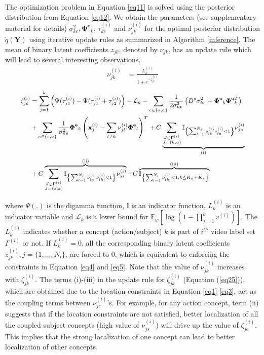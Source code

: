 \documentclass[runningheads]{llncs}
\begin{document}
The optimization problem in Equation \eqref{eq11} is solved using the posterior distribution from Equation \eqref{eq12}. We obtain the parameters (see supplementary material for details) $\sigma_{ke}^2, \mathbf{\Phi^e}_k$, $\tau_{ke}^{(i)}$ and $\nu_{jk}^{(i)}$ for the optimal posterior distribution $\tilde{q}(\mathbf{Y})$ using iterative update rules as summarized in Algorithm \ref{inference}. 
The mean of binary latent coefficients $z_{jk}$, denoted by $\nu_{jk}$, has an update rule which will lead to several interesting observations.
\begin{align}
\nu_{jk}^{(i)} &= \frac{L_k^{(i)}}{1+e^{-\zeta_{jk}^{(i)}}}  \label{eq24}
\end{align}
\vspace{-4mm}
\begin{equation}
\small{
\begin{aligned}
 \label{eq25}
\zeta_{jk}^{(i)} &= \sum_{j=1}^k \left(\Psi(\tau_{j1}^{(i)}) - \Psi(\tau_{j1}^{(i)} + \tau_{j2}^{(i)})\right) - \mathcal{L}_k - \sum_{e\in\{s,a\}}\frac{1}{2\sigma_{ne}^2}\left(D^e\sigma_{ke}^2 + \mathbf{\Phi^e}_k\mathbf{\Phi^e}_k^T\right)  \\ 
&+ \sum_{e\in\{s,a\}} \frac{1}{\sigma_{ne}^2}  \mathbf{\Phi^e}_k\left(\mathbf{x}_j^{(i)} - \sum_{l\neq k} \nu_{jl}^{(i)}\mathbf{\Phi^e}_l\right)^T 
+ C\underbrace{\sum_{\substack{J\in \Gamma^{(i)} \\ J=(k,a)}} \mathbb{I}_{\left\lbrace\sum_{l=1}^{N_i}\nu_{lk}^{(i)}\nu_{la}^{(i)} < 1\right\rbrace} \nu_{ja}^{(i)}}_\text{(i)} \\
 &+ C\overbrace{\sum_{\substack{J\in \Gamma^{(i)} \\ J=(s,k)}} \mathbb{I}_{\left\lbrace\sum_{l=1}^{N_i}\nu_{ls}^{(i)}\nu_{lk}^{(i)} < 1\right\rbrace} \nu_{js}^{(i)}}^\text{(ii)} + C\overbrace{\mathbb{I}_{\left\lbrace\sum_{l=1}^{N_i}\nu_{lk}^{(i)} < 1, k \leq K_a + K_s\right\rbrace}}^\text{(iii)}
 \end{aligned}
 }
\end{equation}

\noindent
where $\Psi(.)$ is the digamma function, $\mathbb{I}$ is an indicator function, $L_k^{(i)}$  is an indicator variable and $\mathcal{L}_k $ is a lower bound for $\mathbb{E}_{\tilde{w}}[\log(1 - \prod_{j=1}^k v^{(i)})]$. The $L_k^{(i)}$ indicates whether a concept (action/subject) $k$ is part of $i^{th}$ video label set $\Gamma^{(i)}$ or not. If $L_k^{(i)} = 0$, all the corresponding binary latent coefficients $z_{jk}^{(i)}, j = \{1,\dots,N_i\}$, are forced to 0, which is equivalent to enforcing the constraints in Equation \eqref{eq4} and \eqref{eq5}. Note that the value of $\nu_{jk}^{(i)}$ increases with $\zeta_{jk}^{(i)}$. The terms (i)-(iii) in the update rule for $\zeta_{jk}^{(i)}$ (Equation (\ref{eq25})), which are obtained due to the location constraints in Equation \eqref{eq1}-\eqref{eq3}, act as the coupling terms between $\nu_{je}^{(i)}$'s. For example, for any action concept, term (ii) suggests that if the location constraints are not satisfied, better localization of all the coupled subject concepts (high value of $\nu_{js}^{(i)}$) will drive up the value of $\zeta_{ja}^{(i)}$. This implies that the strong localization of one concept can lead to better localization of other concepts.
\end{document}
